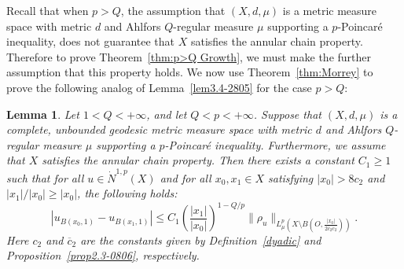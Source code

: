 \documentclass[10pt]{amsart}
\newtheorem{lemma}[theorem]{Lemma}
\numberwithin{equation}{section}
\begin{document}
Recall that when $p>Q$, 
the assumption that   $(X,d,\mu)$ is a metric measure space with metric $d$ and Ahlfors $Q$-regular measure $\mu$ supporting a $p$-Poincar\'e inequality,
 does not guarantee that $X$ satisfies the annular chain property.  Therefore to prove Theorem~\ref{thm:p>Q Growth}, we must make the further assumption that this property holds.  We now use Theorem~\ref{thm:Morrey} to prove the following analog of Lemma~\ref{lem3.4-2805} for the case $p>Q$:
\begin{lemma}\label{lem:p>Q LogLemma}
Let $1<Q<+\infty$, and let $Q<p<+\infty$.  Suppose that $(X,d,\mu)$ is a complete, unbounded geodesic metric measure space with metric $d$ and Ahlfors $Q$-regular measure $\mu$ supporting a $p$-Poincar\'e inequality.  Furthermore, we assume that $X$ satisfies the annular chain property.  Then there exists a constant $C_1\ge 1$ such that for all $u\in\dot N^{1,p}(X)$ and for all $x_0,x_1\in X$ satisfying $|x_0|>8c_2$ and $|x_1|/|x_0|\ge |x_0|$, the following holds:
\begin{equation}
    |u_{B(x_0,1)}-u_{B(x_1,1)}|\le C_1\left(\frac{|x_1|}{|x_0|}\right)^{1-Q/p}\|\rho_u\|_{L^p_\mu\left(X\setminus B\left(O,\frac{|x_0|}{2\overline c_2c_2}\right)\right)}.
\end{equation}
Here $c_2$ and $\overline c_2$ are the constants given by Definition~\ref{dyadic} and Proposition~\ref{prop2.3-0806}, respectively.    
\end{lemma}
\end{document}
